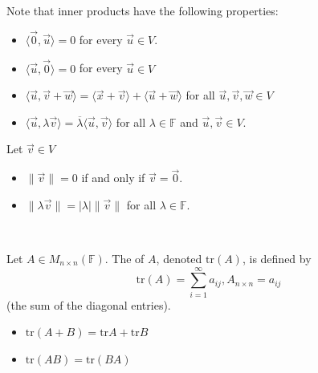 \documentclass[11pt,fleqn]{book} %
\begin{document}
Note that inner products have the following properties:

\begin{itemize}
    \item $\langle \vec{0}, \vec{u} \rangle = 0$ for every $\vec{u} \in V$.
    \item $\langle \vec{u}, \vec{0} \rangle = 0$ for every $\vec{u} \in V$
    \item $\langle \vec{u}, \vec{v} + \vec{w} \rangle = \langle \vec{x} + \vec{v} \rangle + \langle \vec{u} + \vec{w} \rangle$ for all $\vec{u}, \vec{v}, \vec{w} \in V$
    \item $\langle \vec{u}, \lambda \vec{v} \rangle = \overline{\lambda}\langle \vec{u}, \vec{v} \rangle$ for all $\lambda \in \mathbb{F}$ and $\vec{u}, \vec{v} \in V$.
\end{itemize}

Let $\vec{v} \in V$
\begin{itemize}
    \item $\|\vec{v}\| = 0$ if and only if $\vec{v} = \vec{0}$.
    \item $\|\lambda\vec{v}\| = |\lambda|\|\vec{v}\|$ for all $\lambda \in \mathbb{F}$.
\end{itemize}

\setcounter{section}{0}
\setcounter{definitionT}{3}
\begin{definition}[Trace]
{~~~}

    Let $A \in M_{n \times n}(\mathbb{F})$. The  of $A$, denoted $\mathrm{tr}(A)$, is defined by $$\mathrm{tr}(A) = \sum_{i=1}^\infty a_{ij}, A_{n \times n} = a_{ij}$$ (the sum of the diagonal entries).
\end{definition}
\setcounter{section}{3}
\begin{itemize}
    \item $\mathrm{tr}(A + B) = \mathrm{tr}A + \mathrm{tr}B$
    \item $\mathrm{tr}(AB) = \mathrm{tr}(BA)$
\end{itemize}
\end{document}

